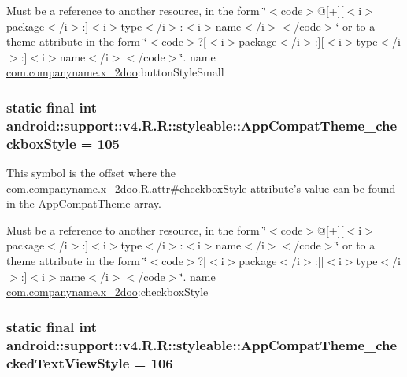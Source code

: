 Must be a reference to another resource, in the form \char`\"{}$<$code$>$@\mbox{[}+\mbox{]}\mbox{[}$<$i$>$package$<$/i$>$:\mbox{]}$<$i$>$type$<$/i$>$:$<$i$>$name$<$/i$>$$<$/code$>$\char`\"{} or to a theme attribute in the form \char`\"{}$<$code$>$?\mbox{[}$<$i$>$package$<$/i$>$:\mbox{]}\mbox{[}$<$i$>$type$<$/i$>$:\mbox{]}$<$i$>$name$<$/i$>$$<$/code$>$\char`\"{}.  name \hyperlink{namespacecom_1_1companyname_1_1x__2doo}{com.companyname.x\_\-2doo}:buttonStyleSmall \hypertarget{classandroid_1_1support_1_1v4_1_1_r_1_1styleable_2952864b487c0fdf826370ab068042b3}{
\subsubsection[{AppCompatTheme\_\-checkboxStyle}]{\setlength{\rightskip}{0pt plus 5cm}static final int android::support::v4.R.R::styleable::AppCompatTheme\_\-checkboxStyle = 105}}
\label{classandroid_1_1support_1_1v4_1_1_r_1_1styleable_2952864b487c0fdf826370ab068042b3}


This symbol is the offset where the \hyperlink{classcom_1_1companyname_1_1x__2doo_1_1_r_1_1attr_74aa4831fd3b631cc6fd50f12888c305}{com.companyname.x\_\-2doo.R.attr\#checkboxStyle} attribute's value can be found in the \hyperlink{classandroid_1_1support_1_1v4_1_1_r_1_1styleable_0873e92ba21076bb5a4aeadeb7f5779f}{AppCompatTheme} array.

Must be a reference to another resource, in the form \char`\"{}$<$code$>$@\mbox{[}+\mbox{]}\mbox{[}$<$i$>$package$<$/i$>$:\mbox{]}$<$i$>$type$<$/i$>$:$<$i$>$name$<$/i$>$$<$/code$>$\char`\"{} or to a theme attribute in the form \char`\"{}$<$code$>$?\mbox{[}$<$i$>$package$<$/i$>$:\mbox{]}\mbox{[}$<$i$>$type$<$/i$>$:\mbox{]}$<$i$>$name$<$/i$>$$<$/code$>$\char`\"{}.  name \hyperlink{namespacecom_1_1companyname_1_1x__2doo}{com.companyname.x\_\-2doo}:checkboxStyle \hypertarget{classandroid_1_1support_1_1v4_1_1_r_1_1styleable_504638bb33551868625294f24e6d75c7}{
\subsubsection[{AppCompatTheme\_\-checkedTextViewStyle}]{\setlength{\rightskip}{0pt plus 5cm}static final int android::support::v4.R.R::styleable::AppCompatTheme\_\-checkedTextViewStyle = 106}}
\label{classandroid_1_1support_1_1v4_1_1_r_1_1styleable_504638bb33551868625294f24e6d75c7}


